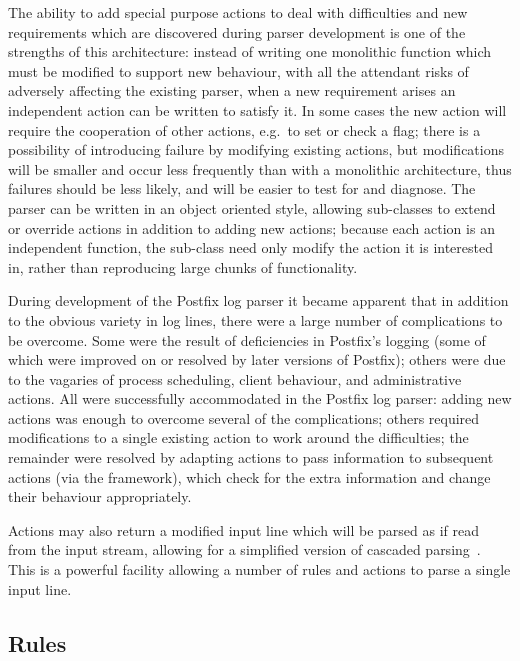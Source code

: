 \documentclass[draft]{svmult}
\begin{document}
The ability to add special purpose actions to deal with difficulties and
new requirements which are discovered during parser development is one of
the strengths of this architecture: instead of writing one monolithic
function which must be modified to support new behaviour, with all the
attendant risks of adversely affecting the existing parser, when a new
requirement arises an independent action can be written to satisfy it.  In
some cases the new action will require the cooperation of other actions,
e.g.\ to set or check a flag; there is a possibility of introducing failure
by modifying existing actions, but modifications will be smaller and occur
less frequently than with a monolithic architecture, thus failures should
be less likely, and will be easier to test for and diagnose.  The parser
can be written in an object oriented style, allowing sub-classes to extend
or override actions in addition to adding new actions; because each action
is an independent function, the sub-class need only modify the action it is
interested in, rather than reproducing large chunks of functionality.

\label{complications}

During development of the Postfix log parser it became apparent that in
addition to the obvious variety in log lines, there were a large number of
complications to be overcome.  Some were the result of deficiencies in
Postfix's logging (some of which were improved on or resolved by later
versions of Postfix); others were due to the vagaries of process
scheduling, client behaviour, and administrative actions.  All were
successfully accommodated in the Postfix log parser: adding new actions was
enough to overcome several of the complications; others required
modifications to a single existing action to work around the difficulties;
the remainder were resolved by adapting actions to pass information to
subsequent actions (via the framework), which check for the extra
information and change their behaviour appropriately.

Actions may also return a modified input line which will be parsed as if
read from the input stream, allowing for a simplified version of cascaded
parsing~\cite{cascaded-parsing}.  This is a powerful facility allowing a
number of rules and actions to parse a single input line.

\subsection{Rules}
\end{document}
